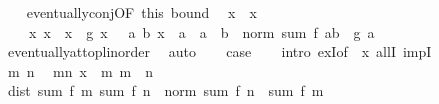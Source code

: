 \begin{isabellebody}
\ \ \isamarkupfalse%
\ eventually{\isacharunderscore}{\kern0pt}conj{\isacharbrackleft}{\kern0pt}OF\ this\ bound{\isacharbrackright}{\kern0pt}\ \isamarkupfalse%
\ x{}\ \ x{}{\isacharcolon}{\kern0pt}\isanewline
\ \ \ \ {\isachardoublequoteopen}{\isasymAnd}x{\isachardot}{\kern0pt}\ x\ {\isasymge}\ x{}\ {\isasymLongrightarrow}\ {\isasymbar}g\ x{\isasymbar}\ {\isacharless}{\kern0pt}\ {\isasymepsilon}{\isachardoublequoteclose}\ {\isachardoublequoteopen}{\isasymAnd}a\ b{\isachardot}{\kern0pt}\ x{}\ {\isasymle}\ a\ {\isasymLongrightarrow}\ a\ {\isacharless}{\kern0pt}\ b\ {\isasymLongrightarrow}\ norm\ {\isacharparenleft}{\kern0pt}sum\ f\ {\isacharbraceleft}{\kern0pt}a{\isacharless}{\kern0pt}{\isachardot}{\kern0pt}{\isachardot}{\kern0pt}b{\isacharbraceright}{\kern0pt}{\isacharparenright}{\kern0pt}\ {\isasymle}\ g\ a{\isachardoublequoteclose}\ \isanewline
\ \ \ \ \isamarkupfalse%
\ eventually{\isacharunderscore}{\kern0pt}at{\isacharunderscore}{\kern0pt}top{\isacharunderscore}{\kern0pt}linorder\ \isamarkupfalse%
\ auto\isanewline
\ \ \isamarkupfalse%
\ {\isacharquery}{\kern0pt}case\isanewline
\ \ \isamarkupfalse%
\ {\isacharparenleft}{\kern0pt}intro\ exI{\isacharbrackleft}{\kern0pt}of\ {\isacharunderscore}{\kern0pt}\ x{}{\isacharbrackright}{\kern0pt}\ allI\ impI{\isacharparenright}{\kern0pt}\isanewline
\ \ \ \ \isamarkupfalse%
\ m\ n\ \isamarkupfalse%
\ mn{\isacharcolon}{\kern0pt}\ {\isachardoublequoteopen}x{}\ {\isasymle}\ m{\isachardoublequoteclose}\ {\isachardoublequoteopen}m\ {\isacharless}{\kern0pt}\ n{\isachardoublequoteclose}\isanewline
\ \ \ \ \isamarkupfalse%
\ {\isachardoublequoteopen}dist\ {\isacharparenleft}{\kern0pt}sum\ f\ {\isacharbraceleft}{\kern0pt}{\isachardot}{\kern0pt}{\isachardot}{\kern0pt}m{\isacharbraceright}{\kern0pt}{\isacharparenright}{\kern0pt}\ {\isacharparenleft}{\kern0pt}sum\ f\ {\isacharbraceleft}{\kern0pt}{\isachardot}{\kern0pt}{\isachardot}{\kern0pt}n{\isacharbraceright}{\kern0pt}{\isacharparenright}{\kern0pt}\ {\isacharequal}{\kern0pt}\ norm\ {\isacharparenleft}{\kern0pt}sum\ f\ {\isacharbraceleft}{\kern0pt}{\isachardot}{\kern0pt}{\isachardot}{\kern0pt}n{\isacharbraceright}{\kern0pt}\ {\isacharminus}{\kern0pt}\ sum\ f\ {\isacharbraceleft}{\kern0pt}{\isachardot}{\kern0pt}{\isachardot}{\kern0pt}m{\isacharbraceright}{\kern0pt}{\isacharparenright}{\kern0pt}{\isachardoublequoteclose}\isanewline

\end{isabellebody}
